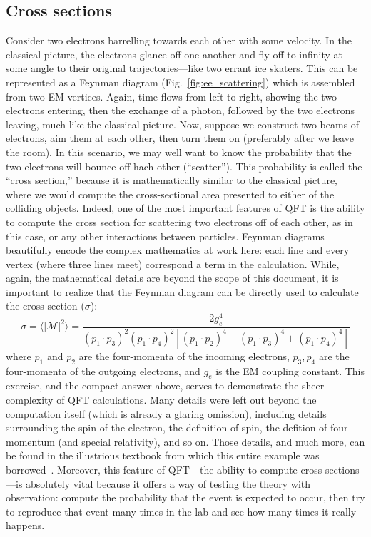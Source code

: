 \subsection{Cross sections}
Consider two electrons barrelling towards each other with some velocity. 
In the classical picture, the electrons glance off one another and fly off to infinity at some angle to their original trajectories---like two errant ice skaters. 
This can be represented as a Feynman diagram (Fig.~\ref{fig:ee_scattering}) which is assembled from two EM vertices. 
Again, time flows from left to right, showing the two electrons entering, then the exchange of a photon, followed by the two electrons leaving, much like the classical picture. 
Now, suppose we construct two beams of electrons, aim them at each other, then turn them on (preferably after we leave the room). 
In this scenario, we may well want to know the probability that the two electrons will bounce off hach other (``scatter''). 
This probability is called the ``cross section,'' because it is mathematically similar to the classical picture\footnotemark{}, where we would compute the cross-sectional area presented to either of the colliding objects. 
Indeed, one of the most important features of QFT is the ability to compute the cross section for scattering two electrons off of each other, as in this case, or any other interactions between particles. 
Feynman diagrams beautifully encode the complex mathematics at work here: each line and every vertex (where three lines meet) correspond a term in the calculation. 
While, again, the mathematical details are beyond the scope of this document, it is important to realize that the Feynman diagram can be directly used to calculate the cross section ($\sigma$):
\begin{equation}
    \sigma = \langle|\mathcal{M}|^2\rangle = \frac{2g_e^4}{(p_1 \cdot p_3)^2(p_1 \cdot p_4)^2[(p_1 \cdot p_2)^4 + (p_1 \cdot p_3)^4 + (p_1 \cdot p_4)^4]}
\end{equation}
where $p_1$ and $p_2$ are the four-momenta of the incoming electrons, $p_3, p_4$ are the four-momenta of the outgoing electrons, and $g_e$ is the EM coupling constant. 
This exercise, and the compact answer above, serves to demonstrate the sheer complexity of QFT calculations. 
Many details were left out beyond the computation itself (which is already a glaring omission), including details surrounding the spin of the electron, the definition of spin, the defition of four-momentum (and special relativity), and so on. 
Those details, and much more, can be found in the illustrious textbook from which this entire example was borrowed~\cite{Griffiths}. 
Moreover, this feature of QFT---the ability to compute cross sections---is absolutely vital because it offers a way of testing the theory with observation: compute the probability that the event is expected to occur, then try to reproduce that event many times in the lab and see how many times it really happens. 

